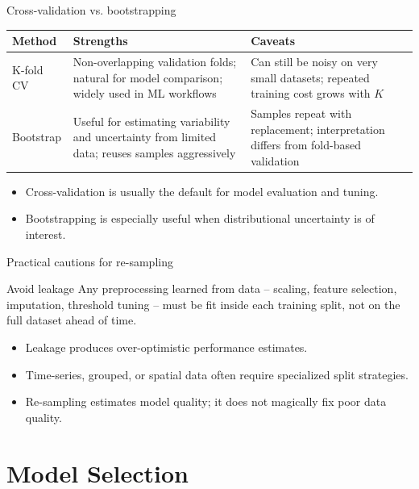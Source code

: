 \documentclass[12pt]{beamer}
\begin{document}
\begin{frame}{Cross-validation vs. bootstrapping}
  \scriptsize
  \renewcommand{\arraystretch}{1.25}
  \setlength{\tabcolsep}{4pt}
  \begin{tabular}{|p{2.1cm}|p{3.2cm}|p{3.2cm}|}
    \hline
    Method & Strengths & Caveats \\
    \hline
    K-fold CV & Non-overlapping validation folds; natural for model comparison; widely used in ML workflows & Can still be noisy on very small datasets; repeated training cost grows with $K$ \\
    \hline
    Bootstrap & Useful for estimating variability and uncertainty from limited data; reuses samples aggressively & Samples repeat with replacement; interpretation differs from fold-based validation \\
    \hline
  \end{tabular}
  \vspace{0.4em}
  \begin{itemize}
    \item Cross-validation is usually the default for model evaluation and tuning.
    \item Bootstrapping is especially useful when distributional uncertainty is of interest.
  \end{itemize}
\end{frame}

\begin{frame}{Practical cautions for re-sampling}
  \begin{warningbox}{Avoid leakage}
    Any preprocessing learned from data -- scaling, feature selection, imputation, threshold tuning --
    must be fit inside each training split, not on the full dataset ahead of time.
  \end{warningbox}
  \begin{itemize}
    \item Leakage produces over-optimistic performance estimates.
    \item Time-series, grouped, or spatial data often require specialized split strategies.
    \item Re-sampling estimates model quality; it does not magically fix poor data quality.
  \end{itemize}
\end{frame}

\section{Model Selection}
\end{document}
